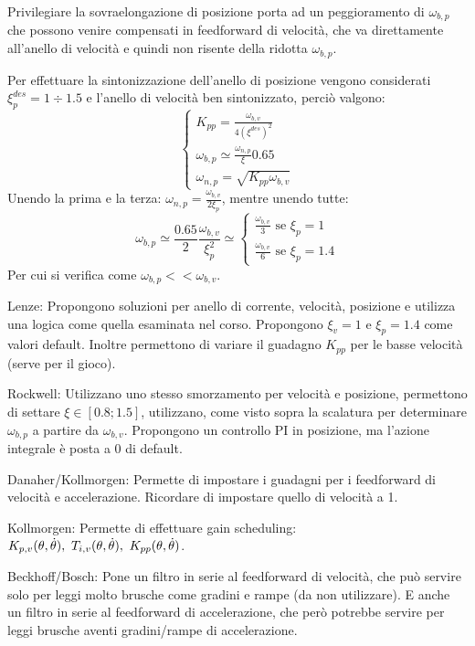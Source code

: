 Privilegiare la sovraelongazione di posizione porta ad un peggioramento di \(\omega_{b,p}\) che possono venire compensati in feedforward di velocità, che va direttamente all'anello di velocità e quindi non risente della ridotta \(\omega_{b,p}\).

Per effettuare la sintonizzazione dell'anello di posizione vengono considerati \(\xi^{des}_p = 1\div 1.5\) e l'anello di velocità ben sintonizzato, perciò valgono:
\[\begin{cases}
    K_{pp} = \frac{\omega_{b,v}}{4(\xi^{des})^2} \\
    \omega_{b,p} \simeq \frac{\omega_{n,p}}{\xi} 0.65 \\
    \omega_{n,p} = \sqrt{K_{pp} \omega_{b,v}}
\end{cases}
\]
Unendo la prima e la terza: \(\omega_{n,p} = \frac{\omega_{b,v}}{2\xi_p}\), mentre unendo tutte: \[\omega_{b,p}\simeq \frac{0.65}{2}\frac{\omega_{b,v}}{\xi^2_p} \simeq 
\begin{cases}
    \frac{\omega_{b,v}}{3} \text{ \ se \ } \xi_p = 1 \\
    \frac{\omega_{b,v}}{6} \text{ \ se \ } \xi_p = 1.4
\end{cases}
\]
Per cui si verifica come \(\omega_{b,p} << \omega_{b,v}\). \label{ordine_anello_pos_vel}

Lenze: Propongono soluzioni per anello di corrente, velocità, posizione e utilizza una logica come quella esaminata nel corso. Propongono \(\xi_v=1\) e \(\xi_p=1.4\) come valori default. Inoltre permettono di variare il guadagno \(K_{pp}\) per le basse velocità (serve per il gioco).

Rockwell: Utilizzano uno stesso smorzamento per velocità e posizione, permettono di settare \(\xi\in [0.8; 1.5]\), utilizzano, come visto sopra la scalatura per determinare \(\omega_{b,p}\) a partire da \(\omega_{b,v}\). Propongono un controllo PI in posizione, ma l'azione integrale è posta a 0 di default.

Danaher/Kollmorgen: Permette di impostare i guadagni per i feedforward di velocità e accelerazione. Ricordare di impostare quello di velocità a 1.

Kollmorgen: Permette di effettuare gain scheduling: \(K_{p,v}(\theta,\dot{\theta}), \ T_{i,v}(\theta,\dot{\theta}), \ K_{pp}(\theta,\dot{\theta})\).

Beckhoff/Bosch: Pone un filtro in serie al feedforward di velocità, che può servire solo per leggi molto brusche come gradini e rampe (da non utilizzare). E anche un filtro in serie al feedforward di accelerazione, che però potrebbe servire per leggi brusche aventi gradini/rampe di accelerazione.

